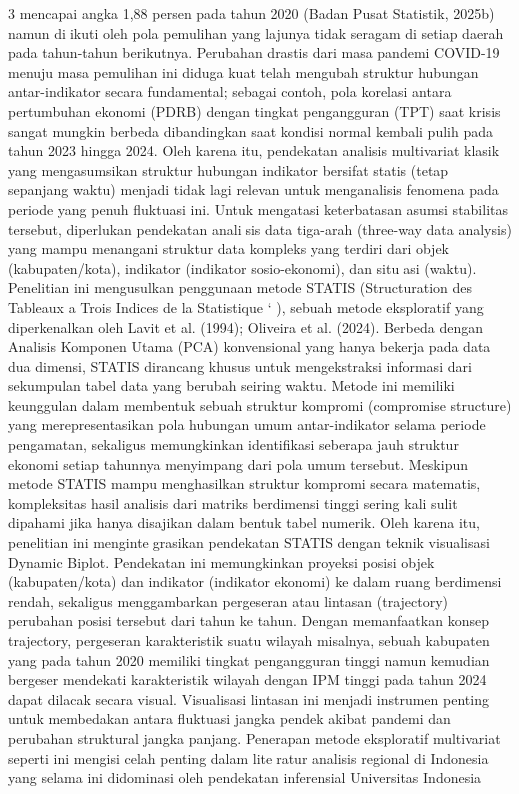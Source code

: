 3
mencapai angka 1,88 persen pada tahun 2020 (Badan Pusat Statistik, 2025b) namun diikuti oleh pola pemulihan yang lajunya tidak seragam di setiap daerah pada tahun-tahun
berikutnya. Perubahan drastis dari masa pandemi COVID-19 menuju masa pemulihan ini
diduga kuat telah mengubah struktur hubungan antar-indikator secara fundamental; sebagai
contoh, pola korelasi antara pertumbuhan ekonomi (PDRB) dengan tingkat pengangguran
(TPT) saat krisis sangat mungkin berbeda dibandingkan saat kondisi normal kembali pulih
pada tahun 2023 hingga 2024. Oleh karena itu, pendekatan analisis multivariat klasik
yang mengasumsikan struktur hubungan indikator bersifat statis (tetap sepanjang waktu)
menjadi tidak lagi relevan untuk menganalisis fenomena pada periode yang penuh fluktuasi
ini.
Untuk mengatasi keterbatasan asumsi stabilitas tersebut, diperlukan pendekatan analisis data tiga-arah (three-way data analysis) yang mampu menangani struktur data kompleks
yang terdiri dari objek (kabupaten/kota), indikator (indikator sosio-ekonomi), dan situasi (waktu). Penelitian ini mengusulkan penggunaan metode STATIS (Structuration des
Tableaux a Trois Indices de la Statistique ` ), sebuah metode eksploratif yang diperkenalkan
oleh Lavit et al. (1994); Oliveira et al. (2024). Berbeda dengan Analisis Komponen
Utama (PCA) konvensional yang hanya bekerja pada data dua dimensi, STATIS dirancang
khusus untuk mengekstraksi informasi dari sekumpulan tabel data yang berubah seiring
waktu. Metode ini memiliki keunggulan dalam membentuk sebuah struktur kompromi
(compromise structure) yang merepresentasikan pola hubungan umum antar-indikator
selama periode pengamatan, sekaligus memungkinkan identifikasi seberapa jauh struktur
ekonomi setiap tahunnya menyimpang dari pola umum tersebut.
Meskipun metode STATIS mampu menghasilkan struktur kompromi secara matematis,
kompleksitas hasil analisis dari matriks berdimensi tinggi sering kali sulit dipahami jika
hanya disajikan dalam bentuk tabel numerik. Oleh karena itu, penelitian ini mengintegrasikan pendekatan STATIS dengan teknik visualisasi Dynamic Biplot. Pendekatan ini
memungkinkan proyeksi posisi objek (kabupaten/kota) dan indikator (indikator ekonomi)
ke dalam ruang berdimensi rendah, sekaligus menggambarkan pergeseran atau lintasan
(trajectory) perubahan posisi tersebut dari tahun ke tahun. Dengan memanfaatkan konsep
trajectory, pergeseran karakteristik suatu wilayah misalnya, sebuah kabupaten yang pada
tahun 2020 memiliki tingkat pengangguran tinggi namun kemudian bergeser mendekati
karakteristik wilayah dengan IPM tinggi pada tahun 2024 dapat dilacak secara visual.
Visualisasi lintasan ini menjadi instrumen penting untuk membedakan antara fluktuasi
jangka pendek akibat pandemi dan perubahan struktural jangka panjang.
Penerapan metode eksploratif multivariat seperti ini mengisi celah penting dalam literatur analisis regional di Indonesia yang selama ini didominasi oleh pendekatan inferensial
Universitas Indonesia

